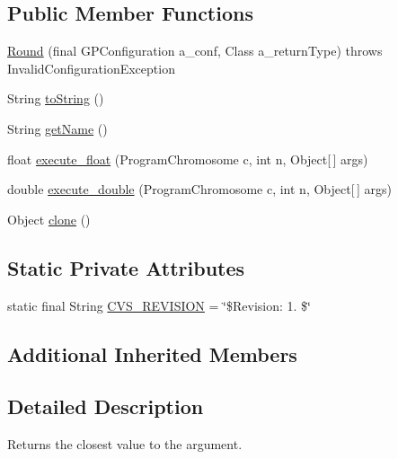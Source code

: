 \subsection*{Public Member Functions}
\begin{DoxyCompactItemize}
\item 
\hyperlink{classorg_1_1jgap_1_1gp_1_1function_1_1_round_abdaa44e0061db81194a2dafc7538fe24}{Round} (final G\-P\-Configuration a\-\_\-conf, Class a\-\_\-return\-Type)  throws Invalid\-Configuration\-Exception 
\item 
String \hyperlink{classorg_1_1jgap_1_1gp_1_1function_1_1_round_aa41255bb467e8b7713d344f176695947}{to\-String} ()
\item 
String \hyperlink{classorg_1_1jgap_1_1gp_1_1function_1_1_round_a686fbbfdb13ea0324c322ae97f666447}{get\-Name} ()
\item 
float \hyperlink{classorg_1_1jgap_1_1gp_1_1function_1_1_round_a909c7a14d38535ce1c19624c96c2330d}{execute\-\_\-float} (Program\-Chromosome c, int n, Object\mbox{[}$\,$\mbox{]} args)
\item 
double \hyperlink{classorg_1_1jgap_1_1gp_1_1function_1_1_round_a13cc2d1b098a2999fa2a900ca533f253}{execute\-\_\-double} (Program\-Chromosome c, int n, Object\mbox{[}$\,$\mbox{]} args)
\item 
Object \hyperlink{classorg_1_1jgap_1_1gp_1_1function_1_1_round_af6ae8d3ce4427f19ca4185fbeff3883b}{clone} ()
\end{DoxyCompactItemize}
\subsection*{Static Private Attributes}
\begin{DoxyCompactItemize}
\item 
static final String \hyperlink{classorg_1_1jgap_1_1gp_1_1function_1_1_round_a0b2dae532ddbee83dd93f1b9daf1530a}{C\-V\-S\-\_\-\-R\-E\-V\-I\-S\-I\-O\-N} = \char`\"{}\$Revision\-: 1. \$\char`\"{}
\end{DoxyCompactItemize}
\subsection*{Additional Inherited Members}


\subsection{Detailed Description}
Returns the closest value to the argument.

